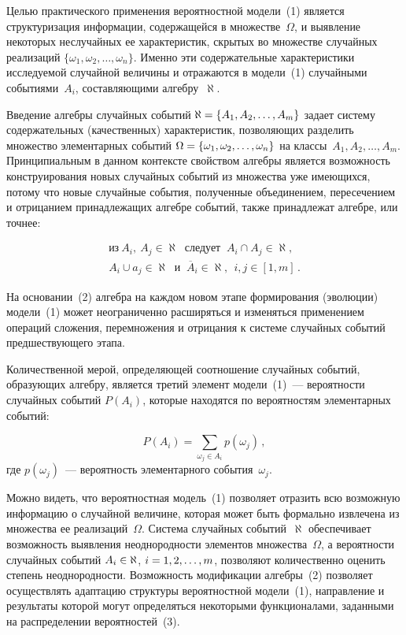 \begin{multicols}{2}
  Целью практического применения вероятностной модели~(1) является
структуризация информации, содержащейся в множестве~$\Omega$, и
выявление некоторых неслучайных ее характеристик, скрытых во множестве
случайных реализаций $\{\omega_1,\omega_2, \ldots ,\omega_n\}$. Именно эти
содержательные характеристики исследуемой случайной величины и
отражаются в модели~(1) случайными событиями~$A_i$, составляющими
алгебру~$\aleph$.

  Введение алгебры случайных событий $\aleph\hm= \{A_1, A_2, \ldots , A_m\}$
задает систему содержательных (качественных) характеристик, позволяющих
разделить множество элементарных событий $\Omega\hm=
\{\omega_1,\omega_2, \ldots ,\omega_n\}$ на классы~$A_1, A_2, \ldots , A_m$.
Принципиальным в данном контексте свойством ал\-геб\-ры является возможность
конструирования новых случайных событий из множества уже имеющихся,
потому что новые случайные события, полученные объединением,
пересечением и отрицанием принадлежащих алгебре событий, также
принадлежат алгебре, или точнее:

\vspace*{-2pt}

\noindent
  \begin{multline}
\mbox{из}\  A_i,\ A_j \in\aleph\  \mbox{ следует }\ A_i \cap A_j\in \aleph,\\
 A_i\cup a_j \in \aleph\
\mbox{ и }\ \overline{A}_i \in \aleph,\ \  i, j\in [1, m]\,.
\label{e2-kuz}
\end{multline}

  На основании~(2) алгебра на каждом новом этапе формирования (эволюции)
модели~(1) может неограниченно расширяться и изменяться применением
операций сложения, перемножения и отрицания к системе случайных событий
предшест\-ву\-юще\-го этапа.

  Количественной мерой, определяющей соотношение случайных событий,
образующих алгебру, является третий элемент модели~(1)~--- вероятности
случайных событий $P(A_i)$, которые находятся по вероятностям
элементарных событий:

\vspace*{2pt}

\noindent
  \begin{equation}
  P(A_i)= \sum\limits_{\omega_j\in A_i} p(\omega_j)\,,
  \label{e3-kuz}
  \end{equation}
где $p(\omega_j)$~--- вероятность элементарного события~$\omega_j$.

  Можно видеть, что вероятностная модель~(1) позволяет отразить всю
возможную информацию о случайной величине, которая может быть
формально извлечена из множества ее реализаций~$\Omega$. Система
случайных событий~$\aleph$ обеспечивает возможность выявления
неоднородности элементов множества~$\Omega$, а вероятности случайных
событий $A_i\hm\in \aleph$, $i\hm =1, 2, \ldots , m$, позволяют количественно
оценить степень неоднородности. Возможность модификации алгебры~(2)
позволяет осуществлять адаптацию структуры вероятностной модели~(1),
направление и результаты которой могут определяться некоторыми
функционалами, заданными на распределении вероятностей~(3).


\end{multicols}
